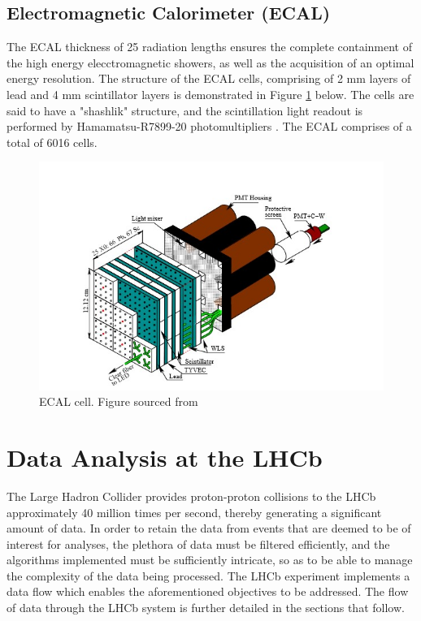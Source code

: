 \subsection{Electromagnetic Calorimeter (ECAL)}
The ECAL thickness of 25 radiation lengths ensures the complete
containment of the high energy elecctromagnetic showers, as well as the acquisition
of an optimal energy resolution. The structure of the ECAL cells, comprising of 2 mm layers of lead and 4 mm scintillator layers is demonstrated in
Figure \ref{ECALStructure} below. The cells are said to have a "shashlik" structure, and the scintillation light readout is performed by Hamamatsu-R7899-20 photomultipliers \cite{AbellanBeteta:2020amj}. 
The ECAL comprises of a total of 6016 cells.
\begin{figure}[H]
    \centering
    \includegraphics[scale = 0.75]{ECALStructure.jpg}
    \caption{ECAL cell. Figure sourced from \cite{AbellanBeteta:2020amj}}
    \label{ECALStructure}
\end{figure}
\section{Data Analysis at the LHCb}
The Large Hadron Collider provides proton-proton collisions to the LHCb approximately 40 million times per second, thereby generating a significant amount of data. In order to retain the data from events that are deemed to be of interest for analyses, the plethora of data must be filtered efficiently, and the algorithms
implemented must be sufficiently intricate, so as to be able to manage the complexity of the data being processed. The LHCb experiment implements a data flow which enables the aforementioned objectives to be addressed. The flow of data through the LHCb system is further detailed in the sections that follow.
